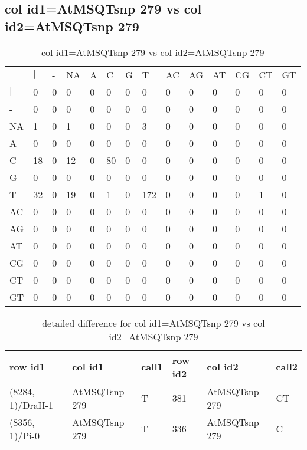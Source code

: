 \subsection{col id1=AtMSQTsnp 279 vs col id2=AtMSQTsnp 279}
\begin{center}
\begin{longtable}{|l|l|l|l|l|l|l|l|l|l|l|l|l|l|}
\caption{col id1=AtMSQTsnp 279 vs col id2=AtMSQTsnp 279} \label{table_dm814}\\
\hline
\\
\hline
&$|$&-&NA&A&C&G&T&AC&AG&AT&CG&CT&GT\\
$|$&0&0&0&0&0&0&0&0&0&0&0&0&0\\
-&0&0&0&0&0&0&0&0&0&0&0&0&0\\
NA&1&0&1&0&0&0&3&0&0&0&0&0&0\\
A&0&0&0&0&0&0&0&0&0&0&0&0&0\\
C&18&0&12&0&80&0&0&0&0&0&0&0&0\\
G&0&0&0&0&0&0&0&0&0&0&0&0&0\\
T&32&0&19&0&1&0&172&0&0&0&0&1&0\\
AC&0&0&0&0&0&0&0&0&0&0&0&0&0\\
AG&0&0&0&0&0&0&0&0&0&0&0&0&0\\
AT&0&0&0&0&0&0&0&0&0&0&0&0&0\\
CG&0&0&0&0&0&0&0&0&0&0&0&0&0\\
CT&0&0&0&0&0&0&0&0&0&0&0&0&0\\
GT&0&0&0&0&0&0&0&0&0&0&0&0&0\\
\hline
\end{longtable}
\end{center}

\begin{center}
\begin{longtable}{|l|l|l|l|l|l|}
\caption{detailed difference for col id1=AtMSQTsnp 279 vs col id2=AtMSQTsnp 279} \label{table_dm815}\\
\hline
row id1&col id1&call1&row id2&col id2&call2\\
\hline
(8284, 1)/DraII-1&AtMSQTsnp 279&T&381&AtMSQTsnp 279&CT\\
(8356, 1)/Pi-0&AtMSQTsnp 279&T&336&AtMSQTsnp 279&C\\
\hline
\end{longtable}
\end{center}

